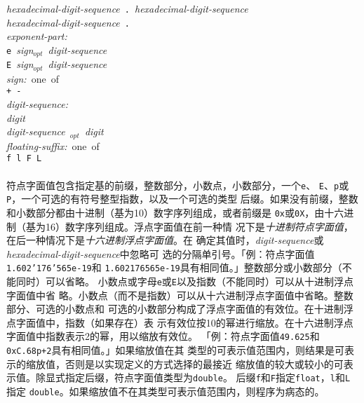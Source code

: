 \mbox{\qquad \qquad \textit{hexadecimal-digit-sequence} \texttt{.}
                    \textit{hexadecimal-digit-sequence}}                      \\
\mbox{\qquad \qquad \textit{hexadecimal-digit-sequence} \texttt{.}}           \\
\noindent \mbox{\qquad \textit{exponent-part:}}                               \\
\mbox{\qquad \qquad \texttt{e} \textit{sign$_{opt}$} \textit{digit-sequence}} \\
\mbox{\qquad \qquad \texttt{E} \textit{sign$_{opt}$} \textit{digit-sequence}} \\
\noindent \mbox{\qquad \textit{sign:} one of}                                 \\
\mbox{\qquad \qquad \texttt{+ -}}                                             \\
\noindent \mbox{\qquad \textit{digit-sequence:}}                              \\
\mbox{\qquad \qquad \textit{digit}}                                           \\
\mbox{\qquad \qquad \textit{digit-sequence}
                    \texttt{\qsgl}\textit{$_{opt}$ digit}}                    \\
\noindent \mbox{\qquad \textit{floating-suffix:} one of}                      \\
\mbox{\qquad \qquad \texttt{f l F L}}                                         \\

\paragraph{}
符点字面值包含指定基的前缀，整数部分，小数点，小数部分，一个\texttt{e}、
\texttt{E}、\texttt{p}或\texttt{P}，一个可选的有符号整型指数，以及一个可选的类型
后缀。如果没有前缀，整数和小数部分都由十进制（基为10）数字序列组成，或者前缀是
\texttt{0x}或\texttt{0X}，由十六进制（基为16）数字序列组成。浮点字面值在前一种情
况下是\textit{十进制符点字面值}，在后一种情况下是\textit{十六进制浮点字面值}。在
确定其值时，\textit{digit-sequence}或\textit{hexadecimal-digit-sequence}中忽略可
选的分隔单引号。「例：符点字面值\texttt{1.602'176'565e-19}和
\texttt{1.602176565e-19}具有相同值。」整数部分或小数部分（不能同时）可以省略。
小数点或字母\texttt{e}或\texttt{E}以及指数（不能同时）可以从十进制浮点字面值中省
略。小数点（而不是指数）可以从十六进制浮点字面值中省略。整数部分、可选的小数点和
可选的小数部分构成了浮点字面值的有效位。在十进制浮点字面值中，指数（如果存在）表
示有效位按10的幂进行缩放。在十六进制浮点字面值中指数表示2的幂，用以缩放有效位。
「例：符点字面值\texttt{49.625}和\texttt{0xC.68p+2}具有相同值。」如果缩放值在其
类型的可表示值范围内，则结果是可表示的缩放值，否则是以实现定义的方式选择的最接近
缩放值的较大或较小的可表示值。除显式指定后缀，符点字面值类型为\texttt{double}。
后缀\texttt{f}和\texttt{F}指定\texttt{float}，\texttt{l}和\texttt{L}指定
\texttt{double}。如果缩放值不在其类型可表示值范围内，则程序为病态的。

